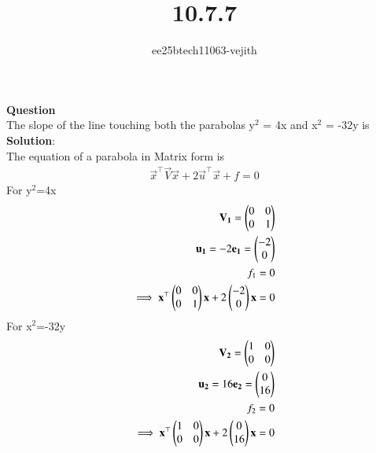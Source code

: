 \documentclass[journal]{IEEEtran}
\begin{document}

\vspace{3cm}

\title{10.7.7}
\author{ee25btech11063-vejith}

\maketitle
{\let\newpage\relax\maketitle}
\renewcommand{\thefigure}{\theenumi}
\renewcommand{\thetable}{\theenumi}
\setlength{\intextsep}{10pt} %
\textbf{Question}\\
The slope of the line touching both the parabolas y$^2$ = 4x and x$^2$ = -32y is\\
\textbf{Solution}:\\
The equation of a parabola in Matrix form is
\begin{align}
\vec{x}^\top\vec{V}\vec{x} + 2\vec{u}^\top\vec{x} + f = 0
\end{align}
For y$^2$=4x
\begin{align}
    \mathbf{V_1}=\begin{pmatrix}
        0 & 0\\
        0 & 1
    \end{pmatrix}\\
    \mathbf{u_1}=-2\mathbf{e_1}=\begin{pmatrix}-2\\0\end{pmatrix}\\
    f_1=0\\
    \implies \mathbf{x}^\top \begin{pmatrix}
        0 & 0\\
        0 &1
    \end{pmatrix}\mathbf{x} +2\begin{pmatrix}-2\\0\end{pmatrix}\mathbf{x}=0
\end{align}
For x$^2$=-32y
\begin{align}
    \mathbf{V_2}=\begin{pmatrix}
        1 & 0\\
        0 & 0
    \end{pmatrix}\\
    \mathbf{u_2}= 16\mathbf{e_2}=\begin{pmatrix}0\\16\end{pmatrix}\\
    f_2=0\\
    \implies \mathbf{x}^\top \begin{pmatrix}
        1 & 0\\
        0 & 0
    \end{pmatrix}\mathbf{x} +2\begin{pmatrix}0\\16\end{pmatrix}\mathbf{x}=0
\end{align}
\end{document}
